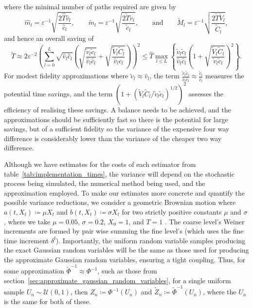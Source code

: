 \documentclass[9pt,a4paper,english]{extarticle}
\begin{document}
where the minimal number of paths required are given by
\begin{equation*}
\widehat{m}_l = \varepsilon^{-1} \sqrt{\dfrac{2\widehat{T}\hat{v}_l}{\hat{c}_l}},
\qquad 
\widetilde{m}_l  = \varepsilon^{-1} \sqrt{\dfrac{2\widetilde{T} \tilde{v}_l}{\tilde{c}_l}}, 
\qquad 
\text{and}
\qquad 
\widetilde{M}_l  = \varepsilon^{-1} \sqrt{\dfrac{2\widetilde{T} \widetilde{V}_l}{\widetilde{C}_l}},
\end{equation*}
and hence an overall saving of
\begin{equation*}
\widetilde{T} 
\approx 2\varepsilon^{-2} \left(\sum_{l=0}^L \sqrt{\hat{v}_l \hat{c}_l} \left( \sqrt{\dfrac{\tilde{v}_l\tilde{c}_l}{\hat{v}_l\hat{c}_l}} + \sqrt{\dfrac{\widetilde{V}_l \widetilde{C}_l}{\hat{v}_l \hat{c}_l}}\right)\right)^2 
\leq \widehat{T} \max_{l \leq L} \left\{ \dfrac{\tilde{v}_l\tilde{c}_l}{\hat{v}_l\hat{c}_l} \left(1 + \sqrt{\dfrac{\widetilde{V}_l \widetilde{C}_l}{\tilde{v}_l \tilde{c}_l}}\right)^2\right\}.
\end{equation*}
For modest fidelity approximations where $ \tilde{v}_l \approx \hat{v}_l $, the term $ \tfrac{\tilde{v}_l\tilde{c}_l}{\hat{v}_l\hat{c}_l} \approx \tfrac{\tilde{c}_l}{\hat{c}_l}$ measures the potential time savings, and the term $ (1 + (\widetilde{V}_l \widetilde{C}_l / \tilde{v}_l \tilde{c}_l)^{1/2})^2 $ assesses the efficiency of realising these savings. A balance needs to be achieved, and the approximations should be sufficiently fast so there is the potential for large savings, but of a sufficient fidelity so the variance of the expensive four way difference is considerably lower than the variance of the cheaper two way difference.

Although we have estimates for the costs of each estimator from table~\ref{tab:implementation_times}, the variance will depend on the stochastic process being simulated, the numerical method being used, and the approximation employed. To make our estimates more concrete and quantify the possible variance reductions, we consider a geometric Brownian motion where $ a(t, X_t) \coloneqq \mu X_t $ and $ b(t, X_t) \coloneqq \sigma X_t $ for two strictly positive constants $ \mu $ and $ \sigma $, where we take $ \mu = 0.05 $, $ \sigma = 0.2 $, $ X_0 = 1 $, and $ T = 1 $ \citep[6.1]{giles2008multilevel}. The coarse level's Weiner increments are formed by pair wise summing the fine level's (which uses the fine time increment $ \delta^{\mathrm{f}} $). Importantly, the uniform random variable samples producing the exact Gaussian random variables will be the same as those used for producing the approximate Gaussian random variables, ensuring a tight coupling. Thus, for some approximation $ \widetilde{\Phi}^{-1} \approx \Phi^{-1} $, such as those from section~\ref{sec:approximate_gaussian_random_variables}, for a single uniform sample $ U_n \sim \mathcal{U}(0, 1) $, then $ Z_n \coloneqq \Phi^{-1}(U_n) $ and $ \widetilde{Z}_n \coloneqq \widetilde{\Phi}^{-1}(U_n) $, where the $ U_n $ is the same for both of these.
\end{document}
